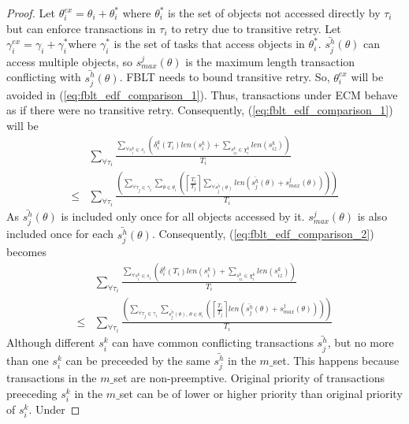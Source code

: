 \documentclass[12pt,english]{report}
\newtheorem{proof}{Proof}
\begin{document}
\begin{proof}
Let $\theta_{i}^{ex}=\theta_{i}+\theta_{i}^{*}$ where $\theta_{i}^{*}$
is the set of objects not accessed directly by $\tau_{i}$ but can
enforce transactions in $\tau_{i}$ to retry due to transitive retry.
Let $\gamma_{i}^{ex}=\gamma_{i}+\gamma_{i}^{*}$where $\gamma_{i}^{*}$
is the set of tasks that access objects in $\theta_{i}^{*}$. $\bar{s_{j}^{h}}(\theta)$
can access multiple objects, so $s_{max}^{j}(\theta)$ is the maximum
length transaction conflicting with $\bar{s_{j}^{h}}(\theta)$. FBLT
needs to bound transitive retry. So, $\theta_{i}^{ex}$ will be avoided
in (\ref{eq:fblt_edf_comparison_1}). Thus, transactions under ECM behave
as if there were no transitive retry. Consequently, (\ref{eq:fblt_edf_comparison_1})
will be 
\begin{eqnarray}
 & \sum_{\forall\tau_{i}}\frac{\sum_{\forall s_{i}^{k}\in s_{i}}\left(\delta_{i}^{k}(T_{i})len(s_{i}^{k})+\sum_{s_{iz}^k\in \chi_i^k} len(s_{iz}^{k})\right)}{T_{i}}\label{eq:fblt_edf_comparison_2}\\
\le & \sum_{\forall\tau_{i}}\frac{\left(\sum_{\forall\tau_{j}\in\gamma_{i}}\sum_{\theta\in\theta_{i}}\left(\left\lceil \frac{T_{i}}{T_{j}}\right\rceil \sum_{\forall\bar{s_{j}^{h}}(\theta)}len\left(\bar{s_{j}^{h}}(\theta)+s_{max}^{j}(\theta)\right)\right)\right)}{T_{i}}\nonumber 
\end{eqnarray}
As $\bar{s_{j}^{h}}(\theta)$ is included only once for all objects
accessed by it. $s_{max}^{j}(\theta)$ is also included once for each
$\bar{s_{j}^{h}}(\theta)$. Consequently, (\ref{eq:fblt_edf_comparison_2})
becomes 
\begin{eqnarray}
 & \sum_{\forall\tau_{i}}\frac{\sum_{\forall s_{i}^{k}\in s_{i}}\left(\delta_{i}^{k}(T_{i})len(s_{i}^{k})+\sum_{s_{iz}^k\in \chi_i^k} len(s_{iz}^{k})\right)}{T_{i}}\label{eq:fblt_edf_comparison_3}\\
\le & \sum_{\forall\tau_{i}}\frac{\left(\sum_{\forall\tau_{j}\in\gamma_{i}}\sum_{\bar{s_{j}^{h}}(\theta),\,\theta\in\theta_{i}}\left(\left\lceil \frac{T_{i}}{T_{j}}\right\rceil len\left(\bar{s_{j}^{h}}(\theta)+s_{max}^{j}(\theta)\right)\right)\right)}{T_{i}}\nonumber 
\end{eqnarray}
Although different $s_{i}^{k}$ can have common conflicting transactions
$\bar{s_{j}^{h}}$, but no more than one $s_{i}^{k}$ can be preceeded
by the same $\bar{s_{j}^{h}}$ in the $m\_$set. This happens because
transactions in the $m\_$set are non-preemptive. Original priority
of transactions preeceding $s_{i}^{k}$ in the $m\_$set can be of
lower or higher priority than original priority of $s_{i}^{k}$. Under

\end{proof}
\end{document}
